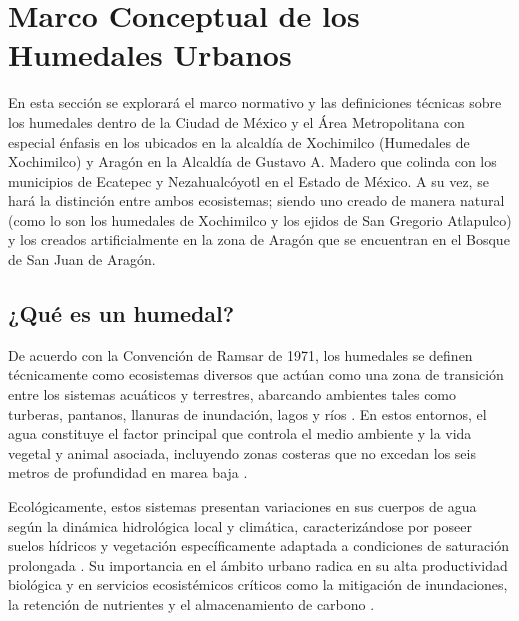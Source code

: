 
\section{Marco Conceptual de los Humedales Urbanos}

En esta sección se explorará el marco normativo y las definiciones técnicas sobre los humedales dentro de la Ciudad de México y el Área Metropolitana
con especial énfasis en los ubicados en la alcaldía de Xochimilco (Humedales de Xochimilco) y Aragón en la Alcaldía de Gustavo A. Madero que colinda
con los municipios de Ecatepec y Nezahualcóyotl en el Estado de México. A su vez, se hará la distinción entre ambos ecosistemas; siendo uno creado de
manera natural (como lo son los humedales de Xochimilco y los ejidos de San Gregorio Atlapulco) y los creados artificialmente en la zona de Aragón que
se encuentran en el Bosque de San Juan de Aragón.

\subsection{¿Qué es un humedal?}
De acuerdo con la Convención de Ramsar de 1971, los humedales se definen técnicamente como ecosistemas diversos que actúan como una zona de transición entre
los sistemas acuáticos y terrestres, abarcando ambientes tales como turberas, pantanos, llanuras de inundación, lagos y ríos \cite{vergara2024humedales}. 
En estos entornos, el agua constituye el factor principal que controla el medio ambiente y la vida vegetal y animal asociada, incluyendo zonas costeras que no 
excedan los seis metros de profundidad en marea baja \cite{paot2006xochimilco, vergara2024humedales}.

Ecológicamente, estos sistemas presentan variaciones en sus cuerpos de agua según la dinámica hidrológica local y climática, caracterizándose por poseer suelos
hídricos y vegetación específicamente adaptada a condiciones de saturación prolongada \cite{vergara2024humedales}. Su importancia en el ámbito urbano radica 
en su alta productividad biológica y en servicios ecosistémicos críticos como la mitigación de inundaciones, la retención de nutrientes y el almacenamiento de 
carbono \cite{vergara2024humedales}.

